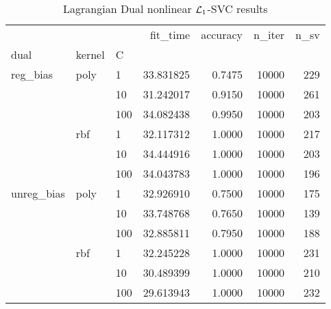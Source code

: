 \begin{table}[H]
\centering
\caption{Lagrangian Dual nonlinear $\protect \mathcal{L}_1$-SVC results}
\label{nonlinear_lagrangian_dual_l1_svc_cv_results}
\begin{tabular}{lllrrrr}
\toprule
           &     &     &   fit\_time &  accuracy &  n\_iter &  n\_sv \\
dual & kernel & C &            &           &         &       \\
\midrule
reg\_bias & poly & 1   &  33.831825 &    0.7475 &   10000 &   229 \\
           &     & 10  &  31.242017 &    0.9150 &   10000 &   261 \\
           &     & 100 &  34.082438 &    0.9950 &   10000 &   203 \\
           & rbf & 1   &  32.117312 &    1.0000 &   10000 &   217 \\
           &     & 10  &  34.444916 &    1.0000 &   10000 &   203 \\
           &     & 100 &  34.043783 &    1.0000 &   10000 &   196 \\
unreg\_bias & poly & 1   &  32.926910 &    0.7500 &   10000 &   175 \\
           &     & 10  &  33.748768 &    0.7650 &   10000 &   139 \\
           &     & 100 &  32.885811 &    0.7950 &   10000 &   188 \\
           & rbf & 1   &  32.245228 &    1.0000 &   10000 &   231 \\
           &     & 10  &  30.489399 &    1.0000 &   10000 &   210 \\
           &     & 100 &  29.613943 &    1.0000 &   10000 &   232 \\
\bottomrule
\end{tabular}
\end{table}
